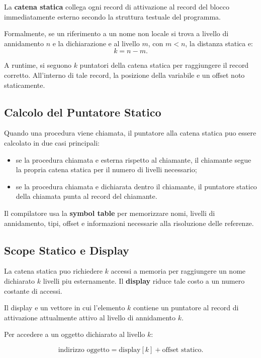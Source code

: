 \documentclass{article}
\begin{document}
La \textbf{catena statica} collega ogni record di attivazione al record del blocco immediatamente esterno secondo la struttura testuale del programma.

Formalmente, se un riferimento a un nome non locale si trova a livello di annidamento $n$ e la dichiarazione e al livello $m$, con $m<n$, la distanza statica e:
\[
k = n-m.
\]

A runtime, si seguono $k$ puntatori della catena statica per raggiungere il record corretto. All'interno di tale record, la posizione della variabile e un offset noto staticamente.

\subsection{Calcolo del Puntatore Statico}

Quando una procedura viene chiamata, il puntatore alla catena statica puo essere calcolato in due casi principali:

\begin{itemize}
  \item se la procedura chiamata e esterna rispetto al chiamante, il chiamante segue la propria catena statica per il numero di livelli necessario;
  \item se la procedura chiamata e dichiarata dentro il chiamante, il puntatore statico della chiamata punta al record del chiamante.
\end{itemize}

Il compilatore usa la \textbf{symbol table} per memorizzare nomi, livelli di annidamento, tipi, offset e informazioni necessarie alla risoluzione delle referenze.

\subsection{Scope Statico e Display}

La catena statica puo richiedere $k$ accessi a memoria per raggiungere un nome dichiarato $k$ livelli piu esternamente. Il \textbf{display} riduce tale costo a un numero costante di accessi.

Il display e un vettore in cui l'elemento $k$ contiene un puntatore al record di attivazione attualmente attivo al livello di annidamento $k$.

Per accedere a un oggetto dichiarato al livello $k$:

\[
\text{indirizzo oggetto}
=
\text{display}[k] + \text{offset statico}.
\]
\end{document}
